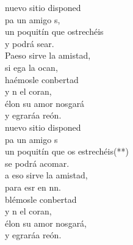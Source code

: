 \begin{cancion}%
	nuevo sitio disponed\\
	pa un amigo s,\\
	un poquitín que ostrechéis\\
	y podrá sear.\\
	Paeso sirve la amistad,\\
	si ega la ocan, \\
	haémosle conbertad\\
	y n el coran,\\
	élon su amor nosgará\\
	y egraráa reón.\\
	\jump
	nuevo sitio disponed\\
	pa un amigo s\\
	\jump
un poquitín que os estrechéis(**)\\
	se podrá acomar.\\
	a eso sirve la amistad,\\
	para esr en nn.\\
	blémosle conbertad\\
	y n el coran,\\
	élon su amor nosgará,\\
	y egraráa reón.\\
\end{cancion}%

